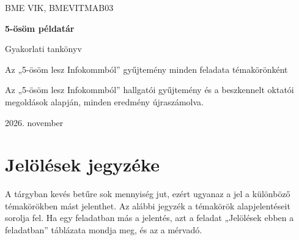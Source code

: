 

\frontmatter
\begin{titlepage}
\centering
\vspace*{30mm}
{\sffamily\large BME VIK, BMEVITMAB03\par}
\vspace{8mm}
{\sffamily\bfseries\Huge 5-ösöm példatár\par}
\vspace{6mm}
{\sffamily\Large Gyakorlati tankönyv\par}
\vspace{6mm}
{\large Az „5-ösöm lesz Infokommból” gyűjtemény minden feladata témakörönként\par}
\vspace{14mm}
\vfill
{\small Az „5-ösöm lesz Infokommból” hallgatói gyűjtemény és a beszkennelt oktatói megoldások alapján, minden eredmény újraszámolva.\par}
\vspace{8mm}
{\small 2026. november\par}
\end{titlepage}

\tableofcontents
\mainmatter
\chapter*{Jelölések jegyzéke}
A tárgyban kevés betűre sok mennyiség jut, ezért ugyanaz a jel a különböző témakörökben mást jelenthet. Az alábbi jegyzék a témakörök alapjelentéseit sorolja fel. Ha egy feladatban más a jelentés, azt a feladat „Jelölések ebben a feladatban” táblázata mondja meg, és az a mérvadó.

